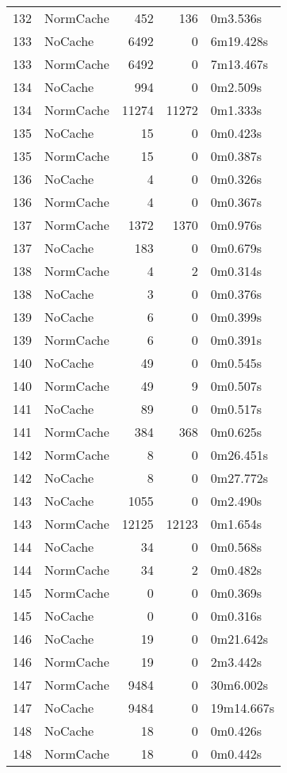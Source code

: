 \begin{tabular}{llrrl}
132 & NormCache & 452 & 136 & 0m3.536s \\
133 & NoCache & 6492 & 0 & 6m19.428s \\
133 & NormCache & 6492 & 0 & 7m13.467s \\
134 & NoCache & 994 & 0 & 0m2.509s \\
134 & NormCache & 11274 & 11272 & 0m1.333s \\
135 & NoCache & 15 & 0 & 0m0.423s \\
135 & NormCache & 15 & 0 & 0m0.387s \\
136 & NoCache & 4 & 0 & 0m0.326s \\
136 & NormCache & 4 & 0 & 0m0.367s \\
137 & NormCache & 1372 & 1370 & 0m0.976s \\
137 & NoCache & 183 & 0 & 0m0.679s \\
138 & NormCache & 4 & 2 & 0m0.314s \\
138 & NoCache & 3 & 0 & 0m0.376s \\
139 & NoCache & 6 & 0 & 0m0.399s \\
139 & NormCache & 6 & 0 & 0m0.391s \\
140 & NoCache & 49 & 0 & 0m0.545s \\
140 & NormCache & 49 & 9 & 0m0.507s \\
141 & NoCache & 89 & 0 & 0m0.517s \\
141 & NormCache & 384 & 368 & 0m0.625s \\
142 & NormCache & 8 & 0 & 0m26.451s \\
142 & NoCache & 8 & 0 & 0m27.772s \\
143 & NoCache & 1055 & 0 & 0m2.490s \\
143 & NormCache & 12125 & 12123 & 0m1.654s \\
144 & NoCache & 34 & 0 & 0m0.568s \\
144 & NormCache & 34 & 2 & 0m0.482s \\
145 & NormCache & 0 & 0 & 0m0.369s \\
145 & NoCache & 0 & 0 & 0m0.316s \\
146 & NoCache & 19 & 0 & 0m21.642s \\
146 & NormCache & 19 & 0 & 2m3.442s \\
147 & NormCache & 9484 & 0 & 30m6.002s \\
147 & NoCache & 9484 & 0 & 19m14.667s \\
148 & NoCache & 18 & 0 & 0m0.426s \\
148 & NormCache & 18 & 0 & 0m0.442s \\

\end{tabular}
